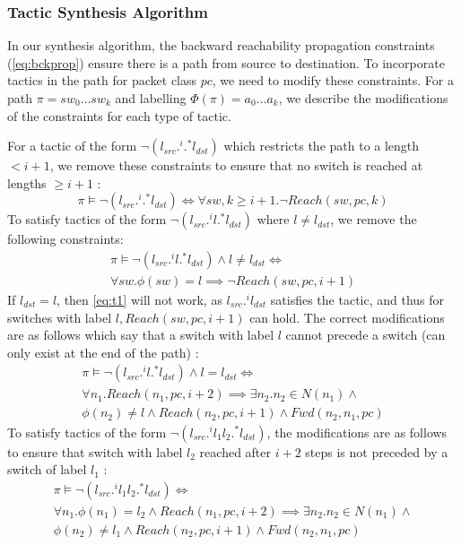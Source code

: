 \subsubsection{Tactic Synthesis Algorithm}
In our synthesis algorithm, the backward reachability propagation constraints (\cref{eq:bckprop}) ensure there is a path from source to destination. To incorporate tactics in the path for packet class $pc$, we need to modify these constraints. For a path $\pi = sw_0 \ldots sw_k$ and labelling $\Phi(\pi) = a_0 \ldots a_k$, we describe the modifications of the constraints for each type of tactic.

For a tactic of the form $\neg (l_{src} .^i .^* l_{dst})$ which restricts the path to a length $ < i + 1$, we remove these constraints to ensure that no switch is reached at lengths $\geq i+1$ : 
\begin{equation}
	\pi \vDash \neg (l_{src} .^i .^* l_{dst}) \Leftrightarrow \forall sw,k \geq i + 1. \neg Reach(sw, pc, k)
\end{equation}
To satisfy tactics of the form $\neg (l_{src}  .^i l .^* l_{dst})$ where $l \not= l_{dst}$, we remove the following constraints:
\begin{multline} \label{eq:t1}
\pi \vDash \neg (l_{src} .^i l .^* l_{dst}) \wedge l \not= l_{dst} \Leftrightarrow \\ \forall sw. \phi(sw) = l \implies \neg Reach(sw, pc, i + 1)
\end{multline}
If $l_{dst} = l$, then \cref{eq:t1} will not work, as $l_{src} .^i l_{dst}$ satisfies the tactic, and thus for switches with label $l,Reach(sw,pc,i+1)$ can hold. The correct modifications are as follows which say that a switch with label $l$ cannot precede a switch (can only exist at the end of the path) : 
\begin{multline} \label{eq:t2}
 \pi \vDash \neg (l_{src} .^i l .^* l_{dst}) \wedge l = l_{dst} \Leftrightarrow \\ 
 \forall n_1. Reach(n_1,pc,i + 2) \implies \exists n_2.  n_2 \in N(n_1) \wedge \\ \phi(n_2) \not= l \wedge 
 Reach(n_2,pc,i+1) \wedge Fwd(n_2,n_1,pc)
\end{multline}
To satisfy tactics of the form $\neg (l_{src}  .^i l_1 l_2 .^* l_{dst})$, the modifications are as follows to ensure that switch with label $l_2$ reached after $i + 2$ steps is not preceded by a switch of label $l_1$ : 
\begin{multline} \label{eq:t3}
\pi \vDash \neg (l_{src} .^i l_1 l_2 .^* l_{dst}) \Leftrightarrow \\ 
\forall n_1. \phi(n_1) = l_2 \wedge Reach(n_1,pc,i + 2) \implies \exists n_2.  n_2 \in N(n_1) \wedge \\ \phi(n_2) \not= l_1 \wedge 
Reach(n_2,pc,i+1) \wedge Fwd(n_2,n_1,pc)
\end{multline}
